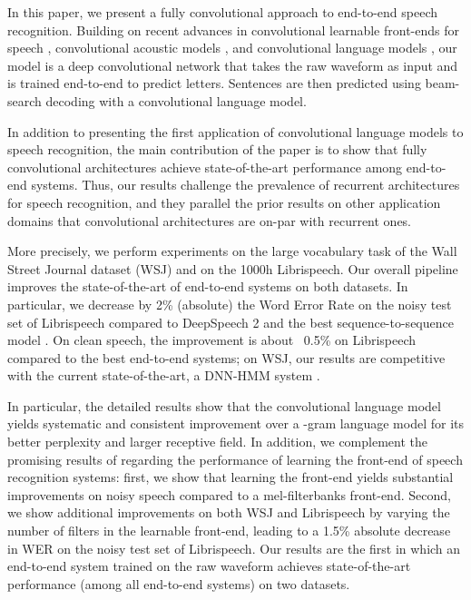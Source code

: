 \documentclass[a4paper]{article}
\begin{document}
In this paper, we present a fully convolutional approach to end-to-end speech recognition. Building on recent advances in convolutional learnable front-ends for speech \cite{tdfbanks1,tdfbanks2}, convolutional acoustic models \cite{wav2letter2}, and convolutional language models \cite{glu}, our model is a deep convolutional network that takes the raw waveform as input and is trained end-to-end to predict letters. Sentences are then predicted using beam-search decoding with a convolutional language model. 

In addition to presenting the first application of convolutional language models to speech recognition, the main contribution of the paper is to show that fully convolutional architectures achieve state-of-the-art performance among end-to-end systems. Thus, our results challenge the prevalence of recurrent architectures for speech recognition, and they parallel the prior results on other application domains that convolutional architectures are on-par with recurrent ones.

More precisely, we perform experiments on the large vocabulary task of the Wall Street Journal dataset (WSJ) and on the 1000h Librispeech. Our overall pipeline improves the state-of-the-art of end-to-end systems on both datasets. In particular, we decrease by 2\%  (absolute) the Word Error Rate on the noisy test set of Librispeech compared to DeepSpeech 2 \cite{deepspeech2} and the best sequence-to-sequence model \cite{improvedzeyer}. On clean speech, the improvement is about ~0.5\% 
on Librispeech compared to the best end-to-end systems; on WSJ, our results are competitive with the current state-of-the-art, a DNN-HMM system \cite{chan2015deep}. 

In particular, the detailed results show that the convolutional language model yields systematic and consistent improvement over a -gram language model for its better perplexity and larger receptive field. In addition, we complement the promising results of \cite{tdfbanks2} regarding the performance of learning the front-end of speech recognition systems: first, we show that learning the front-end yields substantial improvements on noisy speech compared to a mel-filterbanks front-end. Second, we show additional improvements on both WSJ and Librispeech by varying the number of filters in the learnable front-end, leading to a 1.5\% absolute decrease in WER on the noisy test set of Librispeech. Our results are the first in which an end-to-end system trained on the raw waveform achieves state-of-the-art performance (among all end-to-end systems) on two datasets. 
\end{document}
